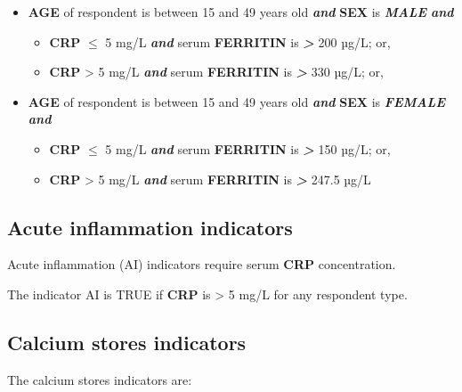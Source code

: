 \documentclass[12pt,a4paper]{article}
\begin{document}
\begin{itemize}
\item
  \textbf{AGE} of respondent is between 15 and 49 years old \textbf{\emph{and}} \textbf{SEX} is \textbf{\emph{MALE}} \textbf{\emph{and}}

  \begin{itemize}
  \item
    \textbf{CRP} \textbf{\emph{\(\leq\)}} 5 mg/L \textbf{\emph{and}} serum \textbf{FERRITIN} is \textbf{\emph{\textgreater{}}} 200 µg/L; or,
  \item
    \textbf{CRP} \textgreater{} 5 mg/L \textbf{\emph{and}} serum \textbf{FERRITIN} is \textbf{\emph{\textgreater{}}} 330 µg/L; or,
  \end{itemize}
\item
  \textbf{AGE} of respondent is between 15 and 49 years old \textbf{\emph{and}} \textbf{SEX} is \textbf{\emph{FEMALE}} \textbf{\emph{and}}

  \begin{itemize}
  \item
    \textbf{CRP} \textbf{\emph{\(\leq\)}} 5 mg/L \textbf{\emph{and}} serum \textbf{FERRITIN} is \textbf{\emph{\textgreater{}}} 150 µg/L; or,
  \item
    \textbf{CRP} \textgreater{} 5 mg/L \textbf{\emph{and}} serum \textbf{FERRITIN} is \textbf{\emph{\textgreater{}}} 247.5 µg/L
  \end{itemize}
\end{itemize}

\hypertarget{acute-inflammation-indicators}{%
\subsection{Acute inflammation indicators}\label{acute-inflammation-indicators}}

Acute inflammation (AI) indicators require serum \textbf{CRP} concentration.

The indicator AI is TRUE if \textbf{CRP} is \textgreater{} 5 mg/L for any respondent type.

\hypertarget{calcium-stores-indicators}{%
\subsection{Calcium stores indicators}\label{calcium-stores-indicators}}

The calcium stores indicators are:
\end{document}
